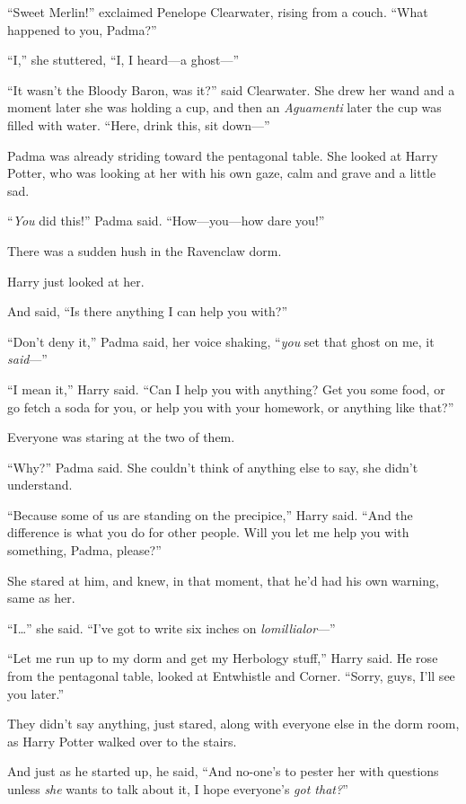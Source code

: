 “Sweet Merlin!” exclaimed Penelope Clearwater, rising from a couch. “What happened to you, Padma?”

“I,” she stuttered, “I, I heard—a ghost—”

“It wasn’t the Bloody Baron, was it?” said Clearwater. She drew her wand and a moment later she was holding a cup, and then an \emph{Aguamenti} later the cup was filled with water. “Here, drink this, sit down—”

Padma was already striding toward the pentagonal table. She looked at Harry Potter, who was looking at her with his own gaze, calm and grave and a little sad.

“\emph{You} did this!” Padma said. “How—you—how dare you!”

There was a sudden hush in the Ravenclaw dorm.

Harry just looked at her.

And said, “Is there anything I can help you with?”

“Don’t deny it,” Padma said, her voice shaking, “\emph{you} set that ghost on me, it \emph{said}—”

“I mean it,” Harry said. “Can I help you with anything? Get you some food, or go fetch a soda for you, or help you with your homework, or anything like that?”

Everyone was staring at the two of them.

“Why?” Padma said. She couldn’t think of anything else to say, she didn’t understand.

“Because some of us are standing on the precipice,” Harry said. “And the difference is what you do for other people. Will you let me help you with something, Padma, please?”

She stared at him, and knew, in that moment, that he’d had his own warning, same as her.

“I…” she said. “I’ve got to write six inches on \emph{lomillialor}—”

“Let me run up to my dorm and get my Herbology stuff,” Harry said. He rose from the pentagonal table, looked at Entwhistle and Corner. “Sorry, guys, I’ll see you later.”

They didn’t say anything, just stared, along with everyone else in the dorm room, as Harry Potter walked over to the stairs.

And just as he started up, he said, “And no-one’s to pester her with questions unless \emph{she} wants to talk about it, I hope everyone’s \emph{got that?}”

